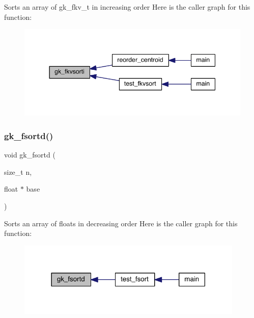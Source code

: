 Sorts an array of gk\+\_\+fkv\+\_\+t in increasing order Here is the caller graph for this function\+:\nopagebreak
\begin{figure}[H]
\begin{center}
\leavevmode
\includegraphics[width=344pt]{a00140_a3cf119da593511faacd54cb35ac8de4e_icgraph}
\end{center}
\end{figure}
\mbox{\label{a00140_a364e63dcdc210ab135b648daf598313e}} 
\subsubsection{\texorpdfstring{gk\+\_\+fsortd()}{gk\_fsortd()}}
{\footnotesize\ttfamily void gk\+\_\+fsortd (\begin{DoxyParamCaption}\item[{size\+\_\+t}]{n,  }\item[{float $\ast$}]{base }\end{DoxyParamCaption})}

Sorts an array of floats in decreasing order Here is the caller graph for this function\+:\nopagebreak
\begin{figure}[H]
\begin{center}
\leavevmode
\includegraphics[width=306pt]{a00140_a364e63dcdc210ab135b648daf598313e_icgraph}
\end{center}
\end{figure}
\mbox{\label{a00140_ab149dbe80d68dde0fd497f852233b3d8}} 
